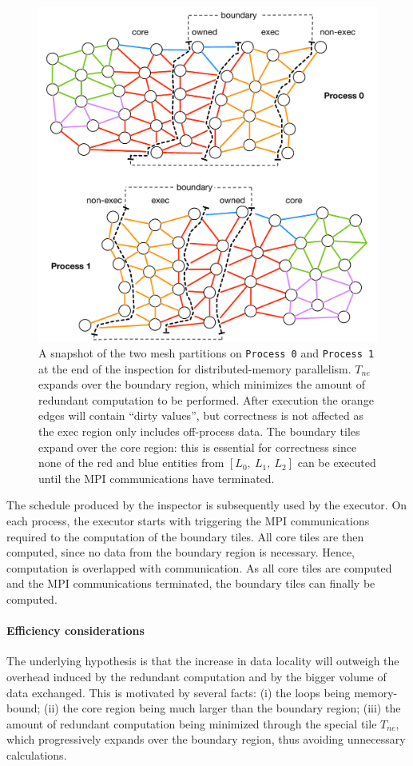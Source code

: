 \begin{figure}[thpb]
\centering
\includegraphics[scale=0.6]{sparsetiling/figures/mpi_loop2.pdf}
\caption{A snapshot of the two mesh partitions on {\tt Process 0} and {\tt Process 1} at the end of the inspection for distributed-memory parallelism. $T_{ne}$ expands over the boundary region, which minimizes the amount of redundant computation to be performed. After execution the orange edges will contain ``dirty  values'', but correctness is not affected as the exec region only includes off-process data. The boundary tiles expand over the core region: this is essential for correctness since none of the red and blue entities from $[L_0,\ L_1,\ L_2]$ can be executed until the MPI communications have terminated.}
\label{fig:st-mpi-growth}
\end{figure}

The schedule produced by the inspector is subsequently used by the executor. On each process, the executor starts with triggering the MPI communications required to the computation of the boundary tiles. All core tiles are then computed, since no data from the boundary region is necessary. Hence, computation is overlapped with communication. As all core tiles are computed and the MPI communications terminated, the boundary tiles can finally be computed.

\paragraph{Efficiency considerations}
The underlying hypothesis is that the increase in data locality will outweigh the overhead induced by the redundant computation and by the bigger volume of data exchanged. This is motivated by several facts: (i) the loops being memory-bound;  (ii) the core region being much larger than the boundary region; (iii) the amount of redundant computation being minimized through the special tile $T_{ne}$, which progressively expands over the boundary region, thus avoiding unnecessary calculations.


